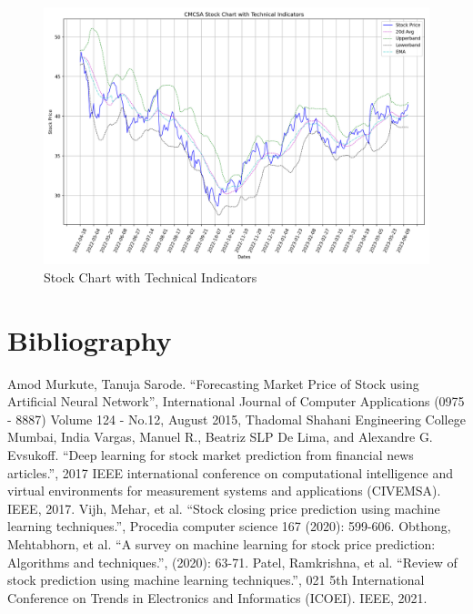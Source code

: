 \documentclass[conference]{IEEEtran}
\begin{document}
\begin{figure}
    \includegraphics[width=\columnwidth]{tech_indicators}
    \caption{Stock Chart with Technical Indicators}
\end{figure}

\section*{Bibliography}

\begin{thebibliography}{00}
 Amod Murkute, Tanuja Sarode. ``Forecasting Market Price of Stock using Artificial Neural Network'', International Journal of Computer Applications (0975 - 8887) Volume 124 - No.12, August 2015, Thadomal Shahani Engineering College Mumbai, India
 Vargas, Manuel R., Beatriz SLP De Lima, and Alexandre G. Evsukoff.  ``Deep learning for stock market prediction from financial news articles.'', 2017 IEEE international conference on computational intelligence and virtual environments for measurement systems and applications (CIVEMSA). IEEE, 2017.
 Vijh, Mehar, et al. ``Stock closing price prediction using machine learning techniques.'', Procedia computer science 167 (2020): 599-606.
 Obthong, Mehtabhorn, et al.  ``A survey on machine learning for stock price prediction: Algorithms and techniques.'', (2020): 63-71.
 Patel, Ramkrishna, et al. ``Review of stock prediction using machine learning techniques.'', 021 5th International Conference on Trends in Electronics and Informatics (ICOEI). IEEE, 2021.
\end{thebibliography}
\vspace{12pt}
\end{document}
